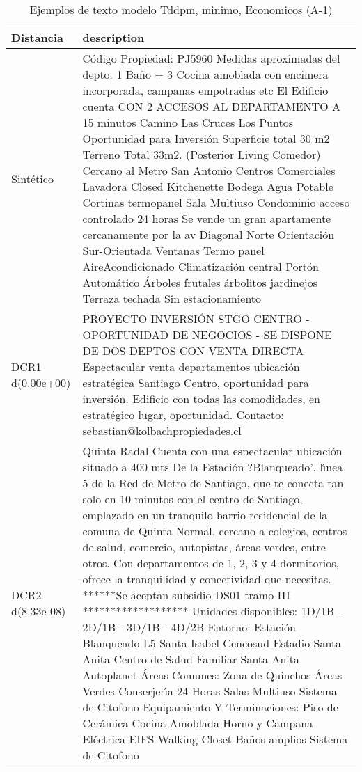 \begin{table}[H]
\centering
\fontsize{10}{14}\selectfont
\caption{Ejemplos de texto modelo Tddpm, minimo, Economicos (A-1)}
\label{table-example-economicos-a-1-tddpm_mlp-min-text}
\begin{tabular}{|l|m{35em}|}
\hline
\rowcolor[gray]{0.8}
Distancia & description \\
\hline Sintético & C\'odigo Propiedad: PJ5960 Medidas aproximadas del depto. 1 Ba\~no + 3 Cocina amoblada con encimera incorporada, campanas empotradas etc El Edificio cuenta CON 2 ACCESOS AL DEPARTAMENTO A 15 minutos Camino Las Cruces Los Puntos Oportunidad para Inversi\'on Superficie total 30 m2 Terreno Total 33m2. (Posterior Living Comedor) Cercano al Metro San Antonio Centros Comerciales Lavadora Closed Kitchenette Bodega Agua Potable Cortinas termopanel Sala Multiuso Condominio acceso controlado 24 horas Se vende un gran apartamente cercanamente por la av Diagonal Norte Orientaci\'on Sur-Orientada Ventanas Termo panel AireAcondicionado Climatizaci\'on central Port\'on Autom\'atico \'Arboles frutales \'arbolitos jardinejos Terraza techada Sin estacionamiento \\
\hline DCR1 d(0.00e+00) & PROYECTO INVERSI\'ON STGO CENTRO - OPORTUNIDAD DE NEGOCIOS - SE DISPONE DE DOS DEPTOS CON VENTA DIRECTA Espectacular venta departamentos ubicaci\'on estrat\'egica Santiago Centro, oportunidad para inversi\'on. Edificio con todas las comodidades, en estrat\'egico lugar, oportunidad. Contacto: sebastian@kolbachpropiedades.cl \\
\hline DCR2 d(8.33e-08) & Quinta Radal Cuenta con una espectacular ubicaci\'on situado a 400 mts De la Estaci\'on ?Blanqueado', l{\'\i}nea 5 de la Red de Metro de Santiago, que te conecta tan solo en 10 minutos con el centro de Santiago, emplazado en un tranquilo barrio residencial de la comuna de Quinta Normal, cercano a colegios, centros de salud, comercio, autopistas, \'areas verdes, entre otros. Con departamentos de 1, 2, 3 y 4 dormitorios, ofrece la tranquilidad y conectividad que necesitas.   ******Se aceptan subsidio DS01 tramo III *******************  Unidades disponibles: 1D/1B - 2D/1B - 3D/1B - 4D/2B  Entorno: Estaci\'on Blanqueado L5 Santa Isabel Cencosud Estadio Santa Anita Centro de Salud Familiar Santa Anita Autoplanet   \'Areas Comunes: Zona de Quinchos \'Areas Verdes Conserjer{\'\i}a 24 Horas Salas Multiuso Sistema de Citofono   Equipamiento Y Terminaciones: Piso de Cer\'amica Cocina Amoblada Horno y Campana El\'ectrica EIFS Walking Closet Ba\~nos amplios Sistema de Citofono \\
\hline
\end{tabular}
\end{table}
